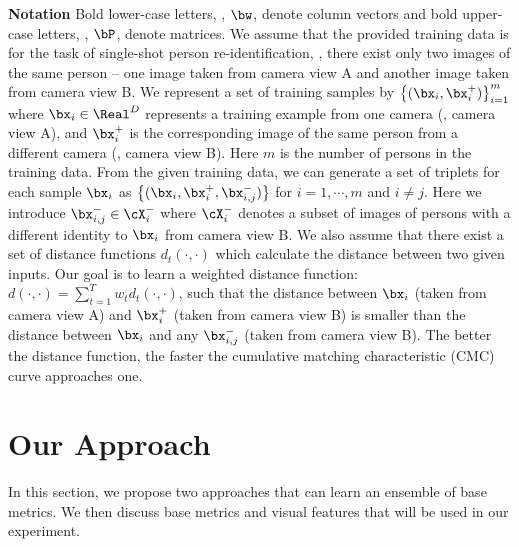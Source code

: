 \documentclass[10pt,twocolumn,letterpaper]{article}
\def\bxi{{\bx_i}}
\def\bxip{{\bx_i^{+}}}
\def\bxijm{{\bx_{i,j}^{-}}}
\renewcommand{\paragraph}{\textbf}
\begin{document}
\paragraph{Notation}
Bold lower-case letters, \eg, $\bw$, denote column vectors and
bold upper-case letters, \eg, $\bP$, denote matrices.
We assume that the provided training data is
for the task of single-shot person re-identification,
\ie, there exist only two images of the same person --
one image taken from camera view A and another image taken from camera view B.
We represent a set of training samples by $\left\{ (\bxi, \bxip) \right\}_{i=1}^m$
where $\bx_i \in {\Real}^D$ represents
a training example from one camera (\ie, camera view A),
and $\bxip$ is the corresponding image of the same person
from a different camera (\ie, camera view B).
Here $m$ is the number of persons in the training data.
From the given training data, we can generate
a set of triplets for each sample $\bxi$ as
$\left\{(\bxi, \bxip, \bxijm) \right\}$
for $i = 1,\cdots,m$ and $i \neq j$.
Here we introduce $\bxijm \in \cX_i^{-}$ where $\cX_i^{-}$ denotes
a subset of images of persons with a different identity to $\bxi$
from camera view B.
We also assume that there exist a set of distance functions
$d_t(\cdot,\cdot)$ which calculate the distance between
two given inputs.
Our goal is to learn a weighted distance function:
$d(\cdot,\cdot) = \sum_{t=1}^T w_t d_t(\cdot,\cdot)$,
such that
the distance between $\bxi$ (taken from camera view A) and $\bxip$
(taken from camera view B)
is smaller than the distance between
$\bxi$ and any $\bxijm$ (taken from camera view B).
The better the distance function, the faster the
cumulative matching characteristic (CMC)
curve approaches one.



\section{Our Approach}
In this section, we propose two approaches that can learn
an ensemble of base metrics.
We then discuss base metrics and visual features
that will be used in our experiment.
\end{document}

